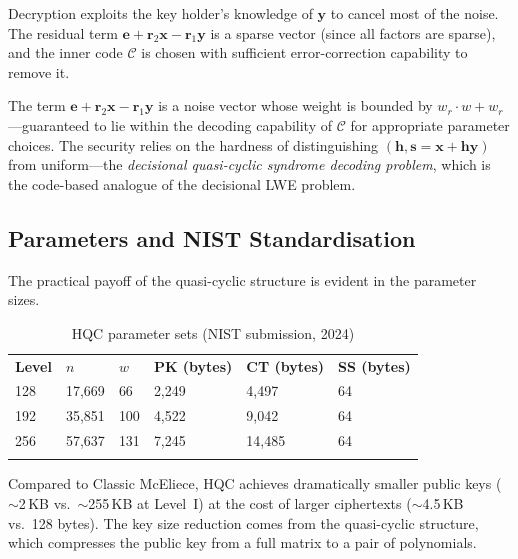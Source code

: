 \begin{definition}
Decryption exploits the key holder's knowledge of $\mathbf{y}$ to cancel most of the noise.  The residual term $\mathbf{e} + \mathbf{r}_2\mathbf{x} - \mathbf{r}_1\mathbf{y}$ is a sparse vector (since all factors are sparse), and the inner code $\mathcal{C}$ is chosen with sufficient error-correction capability to remove it.
\end{definition}

The term $\mathbf{e} + \mathbf{r}_2\mathbf{x} - \mathbf{r}_1\mathbf{y}$ is a noise vector whose weight is bounded by $w_r \cdot w + w_r$---guaranteed to lie within the decoding capability of $\mathcal{C}$ for appropriate parameter choices.  The security relies on the hardness of distinguishing $(\mathbf{h}, \mathbf{s} = \mathbf{x} + \mathbf{h}\mathbf{y})$ from uniform---the \emph{decisional quasi-cyclic syndrome decoding problem}, which is the code-based analogue of the decisional LWE problem.


\subsection{Parameters and NIST Standardisation}
\label{subsec:hqc-params}

The practical payoff of the quasi-cyclic structure is evident in the parameter sizes.

\begin{table}[t]
\caption{HQC parameter sets (NIST submission, 2024)}
\label{tab:hqc-params}
\begin{tabular}{p{2cm}p{1.8cm}p{1.5cm}p{2cm}p{2cm}p{1.5cm}}
\hline\noalign{\smallskip}
\textbf{Level} & \textbf{$n$} & \textbf{$w$} & \textbf{PK (bytes)} & \textbf{CT (bytes)} & \textbf{SS (bytes)} \\
\noalign{\smallskip}\svhline\noalign{\smallskip}
128 & 17,669 & 66 & 2,249 & 4,497  & 64 \\
192 & 35,851 & 100 & 4,522 & 9,042  & 64 \\
256 & 57,637 & 131 & 7,245 & 14,485 & 64 \\
\noalign{\smallskip}\hline
\end{tabular}
\end{table}

Compared to Classic McEliece, HQC achieves dramatically smaller public keys ($\sim$2\,KB vs.\ $\sim$255\,KB at Level~I) at the cost of larger ciphertexts ($\sim$4.5\,KB vs.\ 128 bytes).  The key size reduction comes from the quasi-cyclic structure, which compresses the public key from a full matrix to a pair of polynomials.

